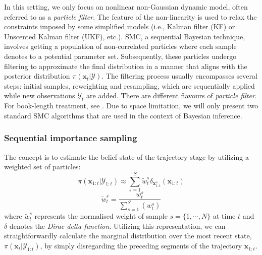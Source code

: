 In this setting, we only focus on nonlinear non-Gaussian dynamic model, often referred to as a \textit{particle filter}. The feature of the non-linearity is used to relax the constraints imposed by some simplified models (i.e., Kalman filter (KF) or Unscented Kalman filter (UKF), etc.). \acrshort{SMC}, a sequential Bayesian technique, involves getting a population of non-correlated particles where each sample denotes to a potential parameter set. Subsequently, these particles undergo filtering to approximate the final distribution in a manner that aligns with the posterior distribution $\pi(\boldsymbol{x}_{t}|\mathcal{Y})$. The filtering process usually encompasses several steps: initial samples, reweighting and resampling, which are sequentially applied while new observations $\mathcal{Y}_{t}$ are added. There are different flavours of \textit{particle filter}. For book-length treatment, see \cite{murphy2012}. Due to space limitation, we will only present two standard \acrshort{SMC} algorithms that are used in the context of Bayesian inference.


\subsubsection{Sequential importance sampling}
The concept is to estimate the belief state of the trajectory stage by utilizing a weighted set of particles:
\begin{equation}
    \label{eq: PF-SIS}
\pi(\boldsymbol{x}_{1:t}|\mathcal{Y}_{1:t})
\approx 
\sum_{s=1}^{S} 
\tilde{w}_{t}^{s}
\delta_{\boldsymbol{x}_{1:t}^{s}}(\boldsymbol{x}_{1:t})
\end{equation}
\begin{equation}
    \label{eq: PF-SIS-Normalized_weight}
\tilde{w}_t^s=\frac{w_t^s}{\sum_{s=1}^{S}{(w_t^s)}}
\end{equation}
where $\tilde{w}_{t}^{s}$ represents the normalised weight of sample $s = \{1,\cdots,N\}$ at time $t$ and  $\delta$ denotes the \textit{Dirac delta function}. Utilizing this representation, we can straightforwardly calculate the marginal distribution over the most recent state, $\pi(\boldsymbol{x}_{t}|\mathcal{Y}_{1:t})$, by simply disregarding the preceding segments of the trajectory $\boldsymbol{x}_{1:t}$.

